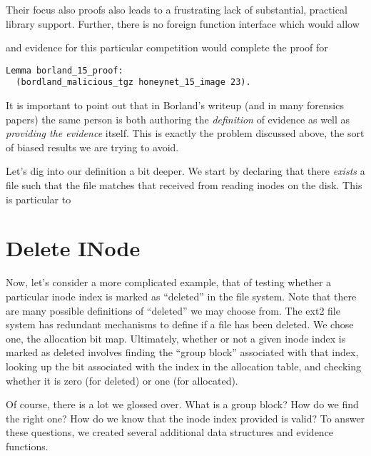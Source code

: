 \documentclass[nocopyrightspace]{sigplanconf}
\begin{document}
Their focus also proofs also leads to a frustrating lack of substantial,
practical library support. Further, there is no foreign function interface
which would allow 


and evidence for this particular competition would complete the proof for

\begin{lstlisting}
Lemma borland_15_proof: 
  (bordland_malicious_tgz honeynet_15_image 23).
\end{lstlisting}

It is important to point out that in Borland's writeup (and in many forensics
papers) the same person is both authoring the {\it definition} of evidence as
well as {\it providing the evidence} itself. This is exactly the problem
discussed above, the sort of biased results we are trying to avoid.

Let's dig into our definition a bit deeper. We start by declaring that there
{\it exists} a file such that the file matches that received from reading
inodes on the disk. This is particular to 


\section{Delete INode}

Now, let's consider a more complicated example, that of testing whether a
particular inode index is marked as ``deleted'' in the file system. Note that
there are many possible definitions of ``deleted'' we may choose from. The
ext2 file system has redundant mechanisms to define if a file has been
deleted. We chose one, the allocation bit map. Ultimately, whether or not a
given inode index is marked as deleted involves finding the ``group block''
associated with that index, looking up the bit associated with the index in
the allocation table, and checking whether it is zero (for deleted) or one
(for allocated).

Of course, there is a lot we glossed over. What is a group block? How do we
find the right one? How do we know that the inode index provided is valid? To
answer these questions, we created several additional data structures and
evidence functions.
\end{document}
